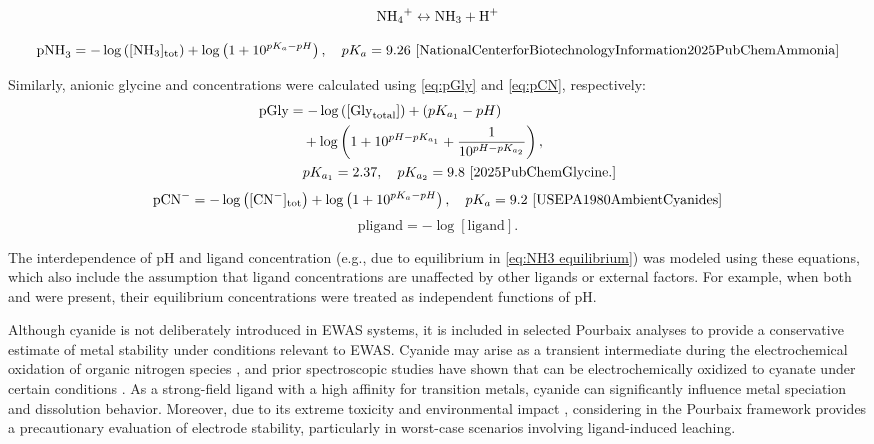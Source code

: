 \documentclass[journal=jacsat,manuscript=article]{achemso}
\begin{document}
\begin{equation} \label{eq:NH3 equilibrium}
\ce{NH4+} \leftrightarrow \ce{NH3} + \ce{H+}
\end{equation}

\begin{equation} \label{eq:pNH3}
\text{pNH}_3 = -\log \left([\text{NH}_3]_{\text{tot}}\right) + \log \left(1 + 10^{pK_a - pH} \right), \quad pK_a = 9.26 \text{ \cite{NationalCenterforBiotechnologyInformation2025PubChemAmmonia}}
\end{equation}

Similarly, anionic glycine and  concentrations were calculated using \ref{eq:pGly} and \ref{eq:pCN}, respectively:
\begin{align} \label{eq:pGly}
\text{pGly} &= -\log \left([\text{Gly}_{\text{total}}]\right) + (pK_{a_1} - pH) \nonumber \\
&\quad + \log \left(1 + 10^{pH - pK_{a_1}} + \frac{1}{10^{pH - pK_{a_2}}} \right), \nonumber \\
&\quad pK_{a_1} = 2.37, \quad pK_{a_2} = 9.8 \text{ \cite{2025PubChemGlycine.}}
\end{align}
\begin{equation} \label{eq:pCN}
\text{pCN}^- = -\log \left([\text{CN}^-]_{\text{tot}}\right) + \log \left(1 + 10^{pK_a - pH} \right), \quad pK_a = 9.2 \text{ \cite{USEPA1980AmbientCyanides}}
\end{equation}
\begin{equation} \label{eq:pligand}
\text{pligand} = -\log[\text{ligand}].
\end{equation}

The interdependence of pH and ligand concentration (e.g., due to  equilibrium in \ref{eq:NH3 equilibrium}) was modeled using these equations, which also include the assumption that ligand concentrations are unaffected by other ligands or external factors. For example, when both  and  were present, their equilibrium concentrations were treated as independent functions of pH.


Although cyanide is not deliberately introduced in EWAS systems, it is included in selected Pourbaix analyses to provide a conservative estimate of metal stability under conditions relevant to EWAS. Cyanide may arise as a transient intermediate during the electrochemical oxidation of organic nitrogen species \cite{Oraby2020GoldPermanganate, Chen2013AdsorptionStudy, Huerta1997ElectrochemicalPt111, Sandoval2011AdsorptionStudy}, and prior spectroscopic studies have shown that  can be electrochemically oxidized to cyanate under certain conditions \cite{Paulissen1992InfraredConditions, Hinman1986FourierElectrodes, Kitamura1986OxidationSpectroscopy, Chen2013AdsorptionStudy}.
As a strong-field ligand with a high affinity for transition metals, cyanide can significantly influence metal speciation and dissolution behavior. Moreover, due to its extreme toxicity and environmental impact \cite{xing2018simple, mekuto2016integrated, bruger2018volatilisation}, considering  in the Pourbaix framework provides a precautionary evaluation of electrode stability, particularly in worst-case scenarios involving ligand-induced leaching.
\end{document}
